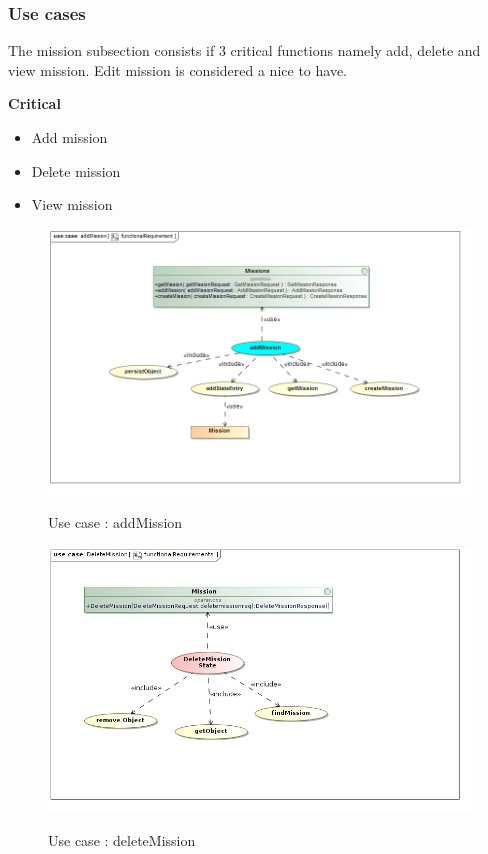 \documentclass{article}
\begin{document}
\subsubsection{Use cases}
	The mission subsection consists if 3 critical functions namely add, delete and view mission. Edit mission is considered a nice to have.
		\begin{flushleft}
			\textbf{Critical}
				\begin{itemize}
	  				\item Add mission
	  				\item Delete mission
	  				\item View mission
				\end{itemize}
				
				\begin{figure}[H]
					\includegraphics[width=\textwidth]{functionalRequirement_addmission.jpg}  \\
					\caption{Use case : addMission}
				\end{figure}
				
				\begin{figure}[H]
					\includegraphics[width=\textwidth]{functionalRequirementsDeleteMission Use Case Diagram.jpg}  \\
					\caption{Use case : deleteMission}
				\end{figure}
				

\end{flushleft}
\end{document}
